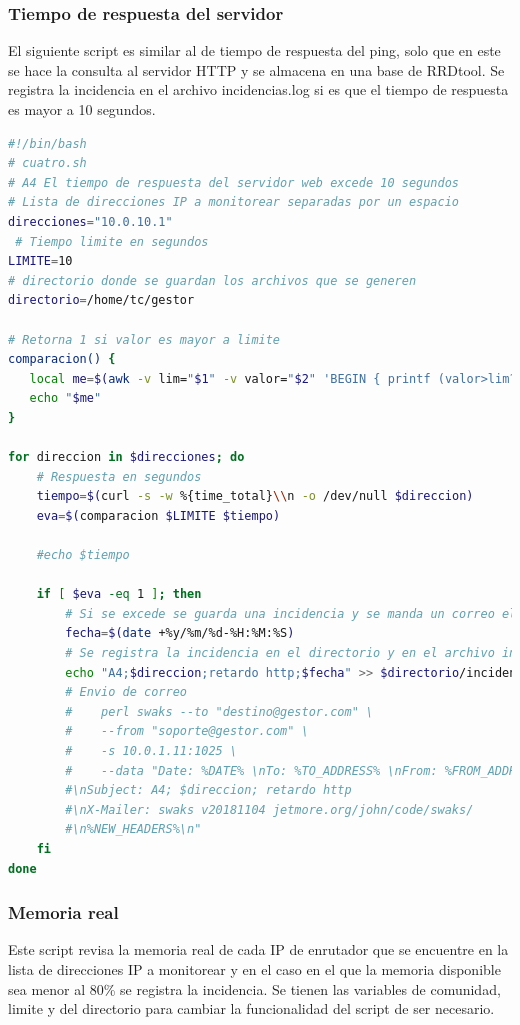 \documentclass[12pt, titlepage]{article}
\begin{document}
\subsubsection{Tiempo de respuesta del servidor}
El siguiente script es similar al de tiempo de respuesta del ping, solo que en este se hace la consulta al servidor HTTP y se almacena en una base de RRDtool. Se registra la incidencia en el archivo incidencias.log si es que el tiempo de respuesta es mayor a 10 segundos.
\begin{lstlisting}[language=bash]
 #!/bin/bash
# cuatro.sh
# A4 El tiempo de respuesta del servidor web excede 10 segundos
# Lista de direcciones IP a monitorear separadas por un espacio
direcciones="10.0.10.1"
 # Tiempo limite en segundos
LIMITE=10
# directorio donde se guardan los archivos que se generen
directorio=/home/tc/gestor

# Retorna 1 si valor es mayor a limite
comparacion() {
   local me=$(awk -v lim="$1" -v valor="$2" 'BEGIN { printf (valor>lim?1:0) }')
   echo "$me"
}

for direccion in $direcciones; do
    # Respuesta en segundos
    tiempo=$(curl -s -w %{time_total}\\n -o /dev/null $direccion)
    eva=$(comparacion $LIMITE $tiempo)

    #echo $tiempo

    if [ $eva -eq 1 ]; then
        # Si se excede se guarda una incidencia y se manda un correo electronico
        fecha=$(date +%y/%m/%d-%H:%M:%S)
        # Se registra la incidencia en el directorio y en el archivo incidencias
        echo "A4;$direccion;retardo http;$fecha" >> $directorio/incidencias.log
        # Envio de correo
        #    perl swaks --to "destino@gestor.com" \
        #    --from "soporte@gestor.com" \
        #    -s 10.0.1.11:1025 \
        #    --data "Date: %DATE% \nTo: %TO_ADDRESS% \nFrom: %FROM_ADDRESS% 
        #\nSubject: A4; $direccion; retardo http 
        #\nX-Mailer: swaks v20181104 jetmore.org/john/code/swaks/
        #\n%NEW_HEADERS%\n"
    fi
done

\end{lstlisting}

\subsubsection{Memoria real}
Este script revisa la memoria real de cada IP de enrutador que se encuentre en la lista de direcciones IP a monitorear y en el caso en el que la memoria disponible sea menor al 80\% se registra la incidencia. Se tienen las variables de comunidad, limite y del directorio para cambiar la funcionalidad del script de ser necesario.
\end{document}
